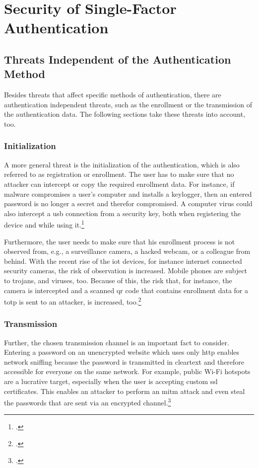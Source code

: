 \chapter{Security of Single-Factor Authentication}
\label{chap:one-factor-security}

\section{Threats Independent of the Authentication Method}

Besides threats that affect specific methods of authentication, there are authentication independent threats, such as the enrollment or the transmission of the authentication data. The following sections take these threats into account, too.

\subsection{Initialization}

A more general threat is the initialization of the authentication, which is also referred to as registration or enrollment. The user has to make sure that no attacker can intercept or copy the required enrollment data. For instance, if malware compromises a user’s computer and installs a keylogger, then an entered password is no longer a secret and therefor compromised. A computer virus could also intercept a \gls{usb} connection from a security key, both when registering the device and while using it.\footcites[See][61]{Ulqinaku:2019:FPP:3317549.3323404}

Furthermore, the user needs to make sure that his enrollment process is not observed from, e.g., a surveillance camera, a hacked webcam, or a colleague from behind. With the recent rise of the \gls{iot} devices, for instance internet connected security cameras, the risk of observation is increased. Mobile phones are subject to trojans, and viruses, too. Because of this, the risk that, for instance, the camera is intercepted and a scanned \gls{qr} code that contains enrollment data for a \gls{totp} is sent to an attacker, is increased, too.\footcites[See][152--153]{10.1007/978-3-642-39235-1_9}[See][371--375]{10.1007/978-3-662-45472-5_24}

\subsection{Transmission}

Further, the chosen transmission channel is an important fact to consider. Entering a password on an unencrypted website which uses only \gls{http} enables network sniffing because the password is transmitted in cleartext and therefore accessible for everyone on the same network. For example, public Wi-Fi hotspots are a lucrative target, especially when the user is accepting custom \gls{ssl} certificates. This enables an attacker to perform an \gls{mitm} attack and even steal the passwords that are sent via an encrypted channel.\footcites[See][518]{10.1007/978-3-030-21548-4_28}


